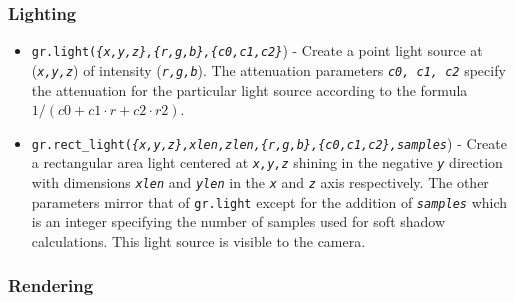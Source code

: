 \documentclass[12pt]{article}
\begin{document}
\subsubsection{Lighting}

\begin{itemize} \itemsep1pt \parskip0pt 
\item{\texttt{gr.light(\textit{\{x,y,z\},\{r,g,b\},\{c0,c1,c2\}}}) - Create a point light source at (\textit{\texttt{x,y,z}}) of intensity (\textit{\texttt{r,g,b}}). The attenuation parameters \textit{\texttt{c0, c1, c2}} specify the attenuation for the particular light source according to the formula $1/(c0 + c1 \cdot r + c2 \cdot r2)$.}

\item{\texttt{gr.rect\_light(\textit{\{x,y,z\},xlen,zlen,\{r,g,b\},\{c0,c1,c2\},samples}}) - Create a rectangular area light centered at \textit{\texttt{x,y,z}} shining in the negative \textit{\texttt{y}} direction with dimensions \textit{\texttt{xlen}} and \textit{\texttt{ylen}} in the \textit{\texttt{x}} and \textit{\texttt{z}} axis respectively. The other parameters mirror that of \texttt{gr.light} except for the addition of \textit{\texttt{samples}} which is an integer specifying the number of samples used for soft shadow calculations. This light source is visible to the camera. }

\end{itemize}

\subsubsection{Rendering}
\end{document}
